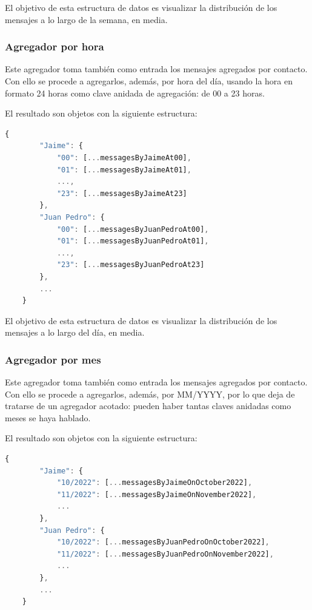 El objetivo de esta estructura de datos es visualizar la distribución de los mensajes a lo largo de la semana, en media.

\subsubsection{Agregador por hora}

Este agregador toma también como entrada los mensajes agregados por contacto. Con ello se procede a agregarlos, además, por hora del día, usando la hora en formato 24 horas como clave anidada de agregación: de 00 a 23 horas.

El resultado son objetos con la siguiente estructura:

\begin{lstlisting}[language=JavaScript]
	{
		"Jaime": {
			"00": [...messagesByJaimeAt00],
			"01": [...messagesByJaimeAt01],
			...,
			"23": [...messagesByJaimeAt23]
		},
		"Juan Pedro": {
			"00": [...messagesByJuanPedroAt00],
			"01": [...messagesByJuanPedroAt01],
			...,
			"23": [...messagesByJuanPedroAt23]
		},
		...
	}
\end{lstlisting}

El objetivo de esta estructura de datos es visualizar la distribución de los mensajes a lo largo del día, en media.

\subsubsection{Agregador por mes}

Este agregador toma también como entrada los mensajes agregados por contacto. Con ello se procede a agregarlos, además, por MM/YYYY, por lo que deja de tratarse de un agregador acotado: pueden haber tantas claves anidadas como meses se haya hablado.

El resultado son objetos con la siguiente estructura:

\begin{lstlisting}[language=JavaScript]
	{
		"Jaime": {
			"10/2022": [...messagesByJaimeOnOctober2022],
			"11/2022": [...messagesByJaimeOnNovember2022],
			...
		},
		"Juan Pedro": {
			"10/2022": [...messagesByJuanPedroOnOctober2022],
			"11/2022": [...messagesByJuanPedroOnNovember2022],
			...
		},
		...
	}
\end{lstlisting}

